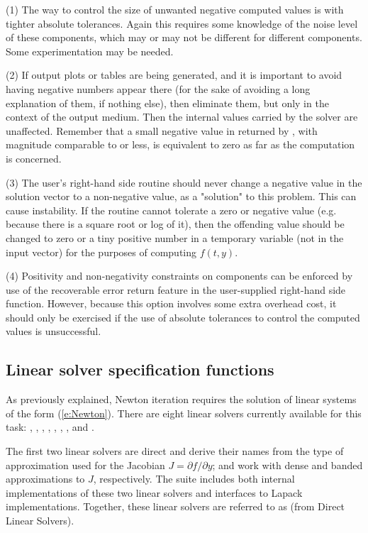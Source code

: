 (1) The way to control the size of unwanted negative computed values
is with tighter absolute tolerances.  Again this requires some
knowledge of the noise level of these components, which may or may not
be different for different components.  Some experimentation may be
needed.

(2) If output plots or tables are being generated, and it is important
to avoid having negative numbers appear there (for the sake of avoiding
a long explanation of them, if nothing else), then eliminate them, but
only in the context of the output medium.  Then the internal values carried
by the solver are unaffected.  Remember that a small negative value in 
returned by {\cvode}, with magnitude comparable to  or less,
is equivalent to zero as far as the computation is concerned.

(3) The user's right-hand side routine  should never change a
negative value in the solution vector  to a non-negative value,
as a "solution" to this problem.  This can cause instability.  If the
 routine cannot tolerate a zero or negative value (e.g. because
there is a square root or log of it), then the offending value should
be changed to zero or a tiny positive number in a temporary variable
(not in the input  vector) for the purposes of computing $f(t,y)$.

(4) Positivity and non-negativity constraints on components can be
enforced by use of the recoverable error return feature in the
user-supplied right-hand side function.  However, because this option
involves some extra overhead cost, it should only be exercised if the
use of absolute tolerances to control the computed values is
unsuccessful.

\subsection{Linear solver specification functions}\label{sss:lin_solv_init}

As previously explained, Newton iteration requires the solution of
linear systems of the form (\ref{e:Newton}).  There are eight {\cvode} linear
solvers currently available for this task: {\cvdense}, {\cvband},
{\cvklu}, {\cvsuperlumt}, {\cvdiag}, {\cvspgmr}, {\cvspbcg}, and {\cvsptfqmr}.

The first two linear solvers are direct and derive their names from the
type of approximation used for the Jacobian $J = \partial{f}/\partial{y}$;
{\cvdense} and {\cvband} work with dense and banded approximations to $J$,
respectively. The {\sundials} suite includes both internal implementations of
these two linear solvers and interfaces to Lapack implementations.
Together, these linear solvers are referred to as {\cvdls} (from Direct
Linear Solvers).

